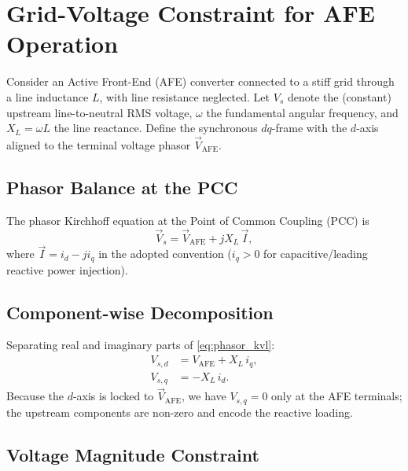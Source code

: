 \documentclass[a4paper,11pt]{article}
\begin{document}

\section{Grid-Voltage Constraint for AFE Operation}

Consider an Active Front-End (AFE) converter connected to a stiff grid
through a line inductance $L$, with line resistance neglected.
Let $V_s$ denote the (constant) upstream line-to-neutral RMS voltage,
$\omega$ the fundamental angular frequency, and $X_L = \omega L$ the
line reactance.
Define the synchronous $dq$-frame with the $d$-axis aligned to the
terminal voltage phasor $\overrightarrow{V}_\mathrm{AFE}$.

\subsection{Phasor Balance at the PCC}

The phasor Kirchhoff equation at the Point of Common Coupling (PCC) is
%
\begin{equation}
	\overrightarrow{V}_s
	= \overrightarrow{V}_\mathrm{AFE}
	+ jX_L\,\overrightarrow{I},
	\label{eq:phasor_kvl}
\end{equation}
%
where $\overrightarrow{I} = i_d - ji_q$ in the adopted convention
($i_q > 0$ for capacitive/leading reactive power injection).

\subsection{Component-wise Decomposition}

Separating real and imaginary parts of \eqref{eq:phasor_kvl}:
%
\begin{align}
	V_{s,d} &= V_\mathrm{AFE} + X_L\,i_q,  \label{eq:Vd}\\
	V_{s,q} &= -X_L\,i_d.                   \label{eq:Vq}
\end{align}
%
Because the $d$-axis is locked to $\overrightarrow{V}_\mathrm{AFE}$,
we have $V_{s,q} = 0$ only at the AFE terminals; the upstream
components are non-zero and encode the reactive loading.

\subsection{Voltage Magnitude Constraint}
\end{document}

